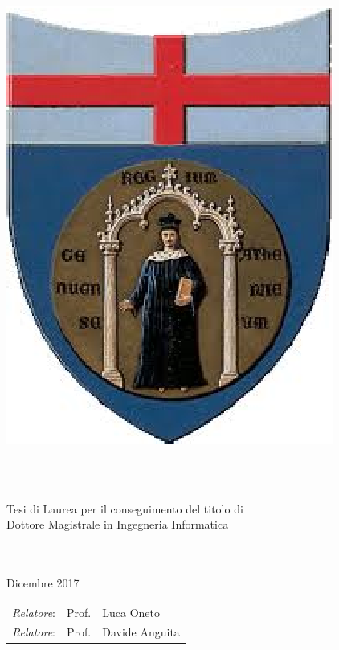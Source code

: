 \documentclass[
11pt, %
english, %
onehalfspacing, %
]{MastersDoctoralThesis} %
\author{Federico \textsc{D'Ambrosio}, Edoardo \textsc{Ferrante}} %
\begin{document}
\hypersetup{colorlinks, urlcolor=blue, linkcolor=blue}

\frontmatter %

\pagestyle{plain} %


\begin{titlepage}
\thispagestyle{empty}
\begin{center}
	\includegraphics[width=0.2\linewidth]{Figures/unige.eps}
\end{center}

\begin{center}
	\LARGE\sc
	\univname\\
	
	\vspace{0.5cm}
	\large
	\degreename\\
\end{center}

\begin{center}
	\small
	Tesi di Laurea per il conseguimento del titolo di\\
	Dottore Magistrale in Ingegneria Informatica\\
\end{center}

\vfill

\begin{center} 
	\LARGE
	{\bf \ttitle}\\
	\vspace{0.5cm}
	\large
	\authorname\\
	\vspace{0.5cm}
	\small
	Dicembre 2017
\end{center}

\vfill

\begin{tabular}{lll}%
	{\em Relatore}:	& Prof.	& Luca Oneto\\
	{\em Relatore}:	& Prof.	& Davide Anguita\\
\end{tabular} 

\hfill


\end{titlepage}
\end{document}
